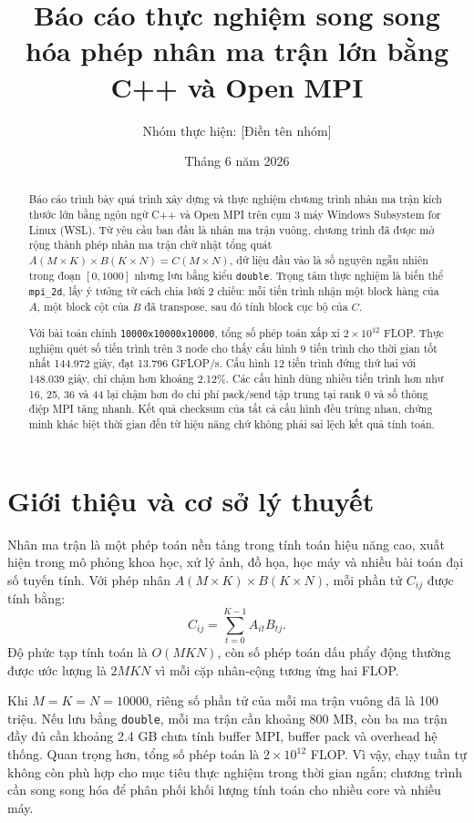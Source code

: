 \documentclass[12pt,a4paper]{article}
\title{\textbf{Báo cáo thực nghiệm song song hóa phép nhân ma trận lớn bằng C++ và Open MPI}}
\author{Nhóm thực hiện: [Điền tên nhóm]}
\date{Tháng 6 năm 2026}
\newcommand{\code}[1]{\texttt{#1}}
\newcommand{\shape}{\code{10000x10000x10000}\xspace}
\begin{document}
\maketitle
\thispagestyle{empty}

\begin{abstract}
Báo cáo trình bày quá trình xây dựng và thực nghiệm chương trình nhân ma trận kích thước lớn bằng ngôn ngữ C++ và Open MPI trên cụm 3 máy Windows Subsystem for Linux (WSL). Từ yêu cầu ban đầu là nhân ma trận vuông, chương trình đã được mở rộng thành phép nhân ma trận chữ nhật tổng quát $A(M \times K) \times B(K \times N) = C(M \times N)$, dữ liệu đầu vào là số nguyên ngẫu nhiên trong đoạn $[0,1000]$ nhưng lưu bằng kiểu \code{double}. Trọng tâm thực nghiệm là biến thể \code{mpi\_2d}, lấy ý tưởng từ cách chia lưới 2 chiều: mỗi tiến trình nhận một block hàng của $A$, một block cột của $B$ đã transpose, sau đó tính block cục bộ của $C$.

Với bài toán chính \shape, tổng số phép toán xấp xỉ $2 \times 10^{12}$ FLOP. Thực nghiệm quét số tiến trình trên 3 node cho thấy cấu hình 9 tiến trình cho thời gian tốt nhất 144.972 giây, đạt 13.796 GFLOP/s. Cấu hình 12 tiến trình đứng thứ hai với 148.039 giây, chỉ chậm hơn khoảng 2.12\%. Các cấu hình dùng nhiều tiến trình hơn như 16, 25, 36 và 44 lại chậm hơn do chi phí pack/send tập trung tại rank 0 và số thông điệp MPI tăng nhanh. Kết quả checksum của tất cả cấu hình đều trùng nhau, chứng minh khác biệt thời gian đến từ hiệu năng chứ không phải sai lệch kết quả tính toán.
\end{abstract}

\newpage

\section{Giới thiệu và cơ sở lý thuyết}
Nhân ma trận là một phép toán nền tảng trong tính toán hiệu năng cao, xuất hiện trong mô phỏng khoa học, xử lý ảnh, đồ họa, học máy và nhiều bài toán đại số tuyến tính. Với phép nhân $A(M \times K) \times B(K \times N)$, mỗi phần tử $C_{ij}$ được tính bằng:
\[
  C_{ij} = \sum_{t=0}^{K-1} A_{it}B_{tj}.
\]
Độ phức tạp tính toán là $O(MKN)$, còn số phép toán dấu phẩy động thường được ước lượng là $2MKN$ vì mỗi cặp nhân-cộng tương ứng hai FLOP.

Khi $M=K=N=10000$, riêng số phần tử của mỗi ma trận vuông đã là 100 triệu. Nếu lưu bằng \code{double}, mỗi ma trận cần khoảng 800 MB, còn ba ma trận đầy đủ cần khoảng 2.4 GB chưa tính buffer MPI, buffer pack và overhead hệ thống. Quan trọng hơn, tổng số phép toán là $2 \times 10^{12}$ FLOP. Vì vậy, chạy tuần tự không còn phù hợp cho mục tiêu thực nghiệm trong thời gian ngắn; chương trình cần song song hóa để phân phối khối lượng tính toán cho nhiều core và nhiều máy.
\end{document}
